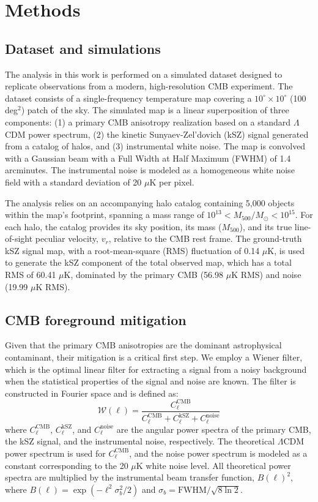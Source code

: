 \documentclass[]{article}
\begin{document}
\section{Methods}
\label{sec:methods}
\subsection{Dataset and simulations}
The analysis in this work is performed on a simulated dataset designed to replicate observations from a modern, high-resolution CMB experiment. The dataset consists of a single-frequency temperature map covering a $10^\circ \times 10^\circ$ (100 deg$^2$) patch of the sky. The simulated map is a linear superposition of three components: (1) a primary CMB anisotropy realization based on a standard $\Lambda$CDM power spectrum, (2) the kinetic Sunyaev-Zel'dovich (kSZ) signal generated from a catalog of halos, and (3) instrumental white noise. The map is convolved with a Gaussian beam with a Full Width at Half Maximum (FWHM) of 1.4 arcminutes. The instrumental noise is modeled as a homogeneous white noise field with a standard deviation of 20 $\mu$K per pixel.

The analysis relies on an accompanying halo catalog containing 5,000 objects within the map's footprint, spanning a mass range of $10^{13} < M_{500} / M_{\odot} < 10^{15}$. For each halo, the catalog provides its sky position, its mass ($M_{500}$), and its true line-of-sight peculiar velocity, $v_r$, relative to the CMB rest frame. The ground-truth kSZ signal map, with a root-mean-square (RMS) fluctuation of 0.14 $\mu$K, is used to generate the kSZ component of the total observed map, which has a total RMS of 60.41 $\mu$K, dominated by the primary CMB (56.98 $\mu$K RMS) and noise (19.99 $\mu$K RMS).

\subsection{CMB foreground mitigation}
Given that the primary CMB anisotropies are the dominant astrophysical contaminant, their mitigation is a critical first step. We employ a Wiener filter, which is the optimal linear filter for extracting a signal from a noisy background when the statistical properties of the signal and noise are known. The filter is constructed in Fourier space and is defined as:
\begin{equation}
    \mathcal{W}(\ell) = \frac{C_\ell^{\text{CMB}}}{C_\ell^{\text{CMB}} + C_\ell^{\text{kSZ}} + C_\ell^{\text{noise}}}
\end{equation}
where $C_\ell^{\text{CMB}}$, $C_\ell^{\text{kSZ}}$, and $C_\ell^{\text{noise}}$ are the angular power spectra of the primary CMB, the kSZ signal, and the instrumental noise, respectively. The theoretical $\Lambda$CDM power spectrum is used for $C_\ell^{\text{CMB}}$, and the noise power spectrum is modeled as a constant corresponding to the 20 $\mu$K white noise level. All theoretical power spectra are multiplied by the instrumental beam transfer function, $B(\ell)^2$, where $B(\ell) = \exp(-\ell^2 \sigma_b^2 / 2)$ and $\sigma_b = \text{FWHM} / \sqrt{8 \ln 2}$.
\end{document}
